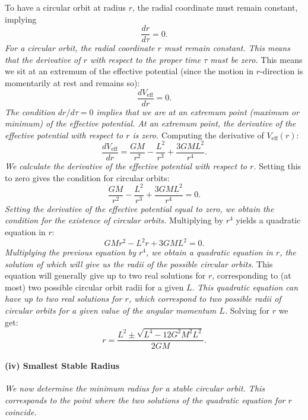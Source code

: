 To have a circular orbit at radius \(r\), the radial coordinate must remain constant, implying
\begin{equation}
\frac{dr}{d\tau} = 0.
\end{equation}
\textit{For a circular orbit, the radial coordinate $r$ must remain constant. This means that the derivative of $r$ with respect to the proper time $\tau$ must be zero.}
This means we sit at an extremum of the effective potential (since the motion in $r$-direction is momentarily at rest and remains so):
\begin{equation}
\frac{dV_{\mathrm{eff}}}{dr} = 0.
\end{equation}
\textit{The condition $dr/d\tau = 0$ implies that we are at an extremum point (maximum or minimum) of the effective potential. At an extremum point, the derivative of the effective potential with respect to $r$ is zero.}
Computing the derivative of $V_{\mathrm{eff}}(r)$:
\begin{equation}
\frac{dV_{\mathrm{eff}}}{dr} = \frac{GM}{r^2} - \frac{L^2}{r^3} + \frac{3 G M L^2}{r^4}.
\end{equation}
\textit{We calculate the derivative of the effective potential with respect to $r$.}
Setting this to zero gives the condition for circular orbits:
\begin{equation}
\frac{GM}{r^2} - \frac{L^2}{r^3} + \frac{3 G M L^2}{r^4} = 0.
\end{equation}
\textit{Setting the derivative of the effective potential equal to zero, we obtain the condition for the existence of circular orbits.}
Multiplying by $r^4$ yields a quadratic equation in $r$:
\begin{equation}
GM r^2 - L^2 r + 3 G M L^2 = 0.
\end{equation}
\textit{Multiplying the previous equation by $r^4$, we obtain a quadratic equation in $r$, the solution of which will give us the radii of the possible circular orbits.}
This equation will generally give up to two real solutions for $r$, corresponding to (at most) two possible circular orbit radii for a given $L$.
\textit{This quadratic equation can have up to two real solutions for $r$, which correspond to two possible radii of circular orbits for a given value of the angular momentum $L$.} Solving for $r$ we get:
\begin{equation}
r = \frac{L^2 \pm \sqrt{L^4 - 12 G^2 M^2 L^2}}{2 G M}.
\end{equation}
\paragraph{(iv) Smallest Stable Radius}
\textit{We now determine the minimum radius for a stable circular orbit. This corresponds to the point where the two solutions of the quadratic equation for $r$ coincide.}

